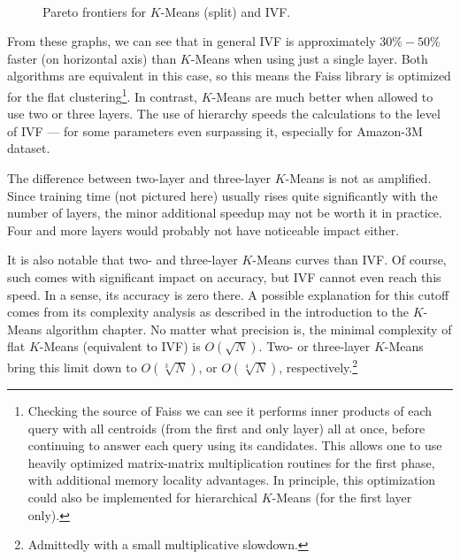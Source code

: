 \begin{figure}
	\centering
	\\
	\caption{Pareto frontiers for $K$-Means (split) and IVF.}
\end{figure}

From these graphs, we can see that in general IVF is approximately $30\% - 50\%$ faster
(on horizontal axis) than  $K$-Means when using just a single layer. Both algorithms are
equivalent in this case, so this means the Faiss library is optimized for the flat clustering\footnote{
Checking the source of Faiss we can see it performs inner products of each query with all centroids
(from the first and only layer) all at once, before continuing to answer each query 
using its candidates. This allows one to use heavily optimized matrix-matrix multiplication
routines for the first phase, with additional memory locality advantages. 
In principle, this optimization
could also be implemented for hierarchical $K$-Means (for the first layer only).
}.
In contrast,  $K$-Means are much better  when allowed to use two or three layers. The use of hierarchy speeds the calculations to the level of IVF --- for some parameters even surpassing
it, especially for Amazon-3M dataset.

The difference between two-layer and three-layer  $K$-Means is not as amplified. Since
training time (not pictured here) usually rises quite significantly with the number of layers,
the minor additional speedup may not be worth it in practice. Four and more layers
would probably not have noticeable impact either.

It is also notable that two- and three-layer $K$-Means curves 
than IVF. Of course, such  comes with significant impact on accuracy, but
IVF cannot even reach this speed. In a sense, its accuracy is zero there.
A possible explanation for this cutoff comes from its complexity analysis as described
in the introduction to the  $K$-Means algorithm chapter. No matter what precision is, the minimal
complexity of flat $K$-Means (equivalent to IVF) is $O(\sqrt{N})$. Two- or three-layer
$K$-Means bring this limit down to $O(\sqrt[3]{N})$, or $O(\sqrt[4]{N})$, 
respectively.\footnote{Admittedly with a small multiplicative slowdown.}

